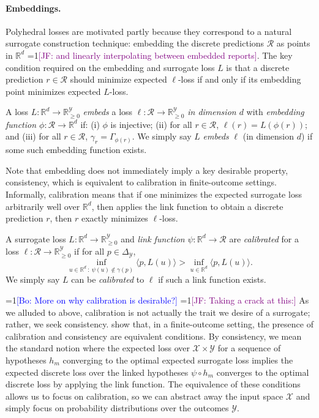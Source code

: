 \documentclass[anon]{colt2020} %
\newcommand{\Comments}{1}
\newcommand{\mynote}[2]{\ifnum\Comments=1\textcolor{#1}{#2}\fi}
\newcommand{\jessie}[1]{\mynote{purple}{[JF: #1]}}
\newcommand{\bo}[1]{\mynote{blue}{[Bo: #1]}}
\newcommand{\reals}{\mathbb{R}}
\newcommand{\nonnegreals}{\reals_{\geq 0}}%
\newcommand{\simplex}{\Delta_\Y}
\newcommand{\R}{\mathcal{R}}
\newcommand{\X}{\mathcal{X}}
\newcommand{\Y}{\mathcal{Y}}
\newcommand{\inprod}[2]{\langle #1, #2 \rangle}%
\begin{document}
\paragraph{Embeddings.}
Polyhedral losses are motivated partly because they correspond to a natural surrogate construction technique: embedding the discrete predictions $\R$ as points in $\reals^d$ \jessie{and linearly interpolating between embedded reports}.
The key condition required on the embedding and surrogate loss $L$ is that a discrete prediction $r \in \R$ should minimize expected $\ell$-loss if and only if its embedding point minimizes expected $L$-loss.
%
\begin{definition}
  A loss $L: \reals^d \to \nonnegreals^{\Y}$ \emph{embeds} a loss $\ell: \R \to \nonnegreals^{\Y}$ \emph{in dimension $d$} with \emph{embedding function $\phi: \R \to \reals^d$} if: (i) $\phi$ is injective; (ii) for all $r \in \R$, $\ell(r) = L(\phi(r))$; and (iii) for all $r \in \R$, $\gamma_r = \Gamma_{\phi(r)}$.
  We simply say $L$ \emph{embeds} $\ell$ (in dimension $d$) if some such embedding function exists.
\end{definition}
%
Note that embedding does not immediately imply a key desirable property, consistency, which is equivalent to calibration in finite-outcome settings.
Informally, calibration means that if one minimizes the expected surrogate loss arbitrarily well over $\reals^d$, then applies the link function to obtain a discrete prediction $r$, then $r$ exactly minimizes $\ell$-loss.
\begin{definition}\label{def:calibration}
  A surrogate loss $L: \reals^d \to \nonnegreals^{\Y}$ and \emph{link function} $\psi: \reals^d \to \R$ are \emph{calibrated} for a loss $\ell: \R \to \nonnegreals^{\Y}$ if for all $p \in \simplex$,
    \[ \inf_{u \in \reals^d ~:~ \psi(u) \not\in \gamma(p)} \inprod{p}{L(u)}  > \inf_{u \in \reals^d} \inprod{p}{L(u)}  .\]
  We simply say $L$ can be \emph{calibrated} to $\ell$ if such a link function exists.
\end{definition}
\bo{More on why calibration is desirable?}
\jessie{Taking a crack at this:}
As we alluded to above, calibration is not actually the trait we desire of a surrogate; rather, we seek consistency.
\cite{tewari2007consistency} show that, in a finite-outcome setting, the presence of calibration and consistency are equivalent conditions.
By consistency, we mean the standard notion where the expected loss over $\X \times \Y$ for a sequence of hypotheses $h_m$ converging to the optimal expected surrogate loss implies the expected discrete loss over the linked hypotheses $\psi \circ h_m$ converges to the optimal discrete loss by applying the link function.
The equivalence of these conditions allows us to focus on calibration, so we can abstract away the input space $\X$ and simply focus on probability distributions over the outcomes $\Y$.
\end{document}
